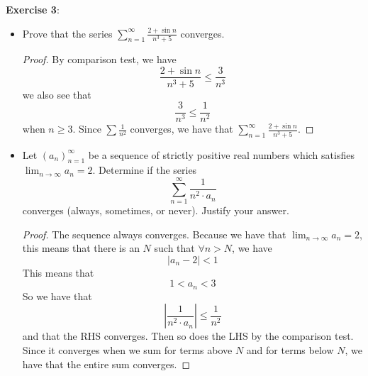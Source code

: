 \documentclass{article}
\begin{document}
\textbf{Exercise 3}:
    \begin{itemize}
        \item Prove that the series $\sum_{n = 1}^{\infty} \frac{2 + \sin{n}}{n^{3} + 5}$ converges.
            \begin{proof}
                By comparison test, we have 
                    \begin{equation*}
                        \dfrac{2 + \sin{n}}{n^{3} + 5} \leq \dfrac{3}{n^{3}}
                    \end{equation*}
                we also see that 
                    \begin{equation*}
                        \dfrac{3}{n^{3}} \leq \dfrac{1}{n^{2}}
                    \end{equation*}
                when $n \geq 3$. Since $\sum \frac{1}{n^{2}}$ converges, we have that $\sum_{n = 1}^{\infty}\frac{2 + \sin{n}}{n^{3} + 5}$.
            \end{proof}

        \item Let $(a_{n})_{n = 1}^{\infty}$ be a sequence of strictly positive real numbers which satisfies $\lim_{n \to \infty}a_{n} = 2$. Determine if the series
            \begin{equation*}
                \sum_{n = 1}^{\infty}\dfrac{1}{n^{2} \cdot a_{n}}
            \end{equation*}
        converges (always, sometimes, or never). Justify your answer.
            \begin{proof}
                The sequence always converges. Because we have that $\lim_{n \to \infty} a_{n} = 2$, this means that there is an $N$ such that $\forall n > N$, we have 
                    \begin{equation*}
                        \lvert a_{n} - 2 \rvert < 1
                    \end{equation*}
                This means that 
                    \begin{equation*}
                        1 < a_{n} < 3
                    \end{equation*}
                So we have that 
                    \begin{equation*}
                        \left\lvert \dfrac{1}{n^{2} \cdot a_{n}} \right\rvert \leq \dfrac{1}{n^{2}}
                    \end{equation*}
                and that the RHS converges. Then so does the LHS by the comparison test. Since it converges when we sum for terms above $N$ and for terms below $N$, we have that the entire sum converges.
            \end{proof}
    \end{itemize}
\end{document}
